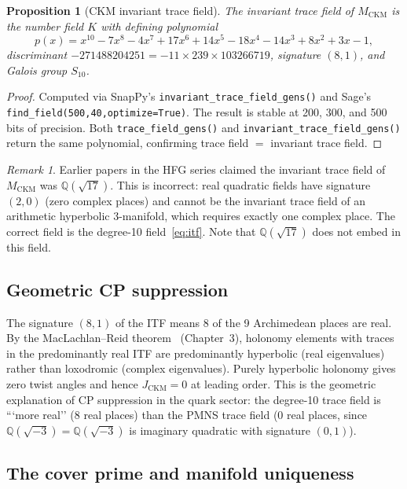 \documentclass[11pt,a4paper]{article}
\newtheorem{proposition}[theorem]{Proposition}
\theoremstyle{remark}
\newtheorem{remark}[theorem]{Remark}
\newcommand{\MCKM}{M_{\mathrm{CKM}}}
\newcommand{\QQ}{\mathbb{Q}}
\begin{document}
\begin{proposition}[CKM invariant trace field]
\label{prop:itf}
The invariant trace field of $\MCKM$ is the number field $K$ with
defining polynomial
\begin{equation}
p(x) = x^{10}-7x^8-4x^7+17x^6+14x^5-18x^4-14x^3+8x^2+3x-1,
\label{eq:itf}
\end{equation}
discriminant $-271488204251 = -11\times239\times103266719$,
signature $(8,1)$, and Galois group $S_{10}$.
\end{proposition}

\begin{proof}
Computed via SnapPy's \texttt{invariant\_trace\_field\_gens()}
and Sage's \texttt{find\_field(500,40,optimize=True)}.
The result is stable at 200, 300, and 500 bits of precision.
Both \texttt{trace\_field\_gens()} and \texttt{invariant\_trace\_field\_gens()}
return the same polynomial, confirming trace field $=$ invariant
trace field.
\end{proof}

\begin{remark}
Earlier papers in the HFG series claimed the invariant trace field
of $\MCKM$ was $\QQ(\sqrt{17})$.
This is incorrect: real quadratic fields have signature $(2,0)$
(zero complex places) and cannot be the invariant trace field
of an arithmetic hyperbolic 3-manifold, which requires exactly
one complex place.
The correct field is the degree-10 field~\eqref{eq:itf}.
Note that $\QQ(\sqrt{17})$ does not embed in this field.
\end{remark}

\subsection{Geometric CP suppression}

The signature $(8,1)$ of the ITF means 8 of the 9 Archimedean
places are real.
By the MacLachlan--Reid theorem~\cite{MaclachlanReid} (Chapter~3),
holonomy elements with traces in the predominantly real ITF are
predominantly hyperbolic (real eigenvalues) rather than loxodromic
(complex eigenvalues).
Purely hyperbolic holonomy gives zero twist angles and hence
$J_{\mathrm{CKM}} = 0$ at leading order.
This is the geometric explanation of CP suppression in the quark
sector: the degree-10 trace field is ```more real'' (8 real places)
than the PMNS trace field (0 real places, since
$\mathbb{Q}(\sqrt{-3}) = \QQ(\sqrt{-3})$ is imaginary quadratic with signature $(0,1)$).

\subsection{The cover prime and manifold uniqueness}
\end{document}
